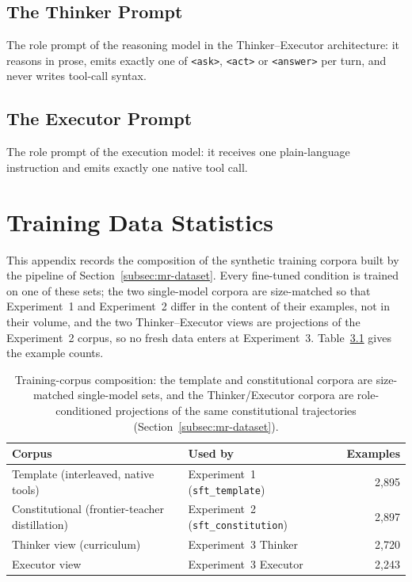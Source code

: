 

\section{The Thinker Prompt}
The role prompt of the reasoning model in the Thinker--Executor architecture: it reasons in prose, emits exactly one of \texttt{<ask>}, \texttt{<act>} or \texttt{<answer>} per turn, and never writes tool-call syntax.



\section{The Executor Prompt}
The role prompt of the execution model: it receives one plain-language instruction and emits exactly one native tool call.



\chapter{Training Data Statistics}
\label{chap:training-data-statistics}

This appendix records the composition of the synthetic training corpora built by the pipeline of Section~\ref{subsec:mr-dataset}. Every fine-tuned condition is trained on one of these sets; the two single-model corpora are size-matched so that Experiment~1 and Experiment~2 differ in the content of their examples, not in their volume, and the two Thinker--Executor views are projections of the Experiment~2 corpus, so no fresh data enters at Experiment~3. Table~\ref{tab:data-composition} gives the example counts.

\begin{table}[H]
  \centering
  \caption{Training-corpus composition: the template and constitutional corpora are size-matched single-model sets, and the Thinker/Executor corpora are role-conditioned projections of the same constitutional trajectories (Section~\ref{subsec:mr-dataset}).}
  \label{tab:data-composition}
  \begin{tabular}{llr}
    \toprule
    Corpus & Used by & Examples \\
    \midrule
    Template (interleaved, native tools) & Experiment~1 (\texttt{sft\_template}) & 2{,}895 \\
    Constitutional (frontier-teacher distillation) & Experiment~2 (\texttt{sft\_constitution}) & 2{,}897 \\
    Thinker view (curriculum) & Experiment~3 Thinker & 2{,}720 \\
    Executor view & Experiment~3 Executor & 2{,}243 \\
    \bottomrule
  \end{tabular}
\end{table}

